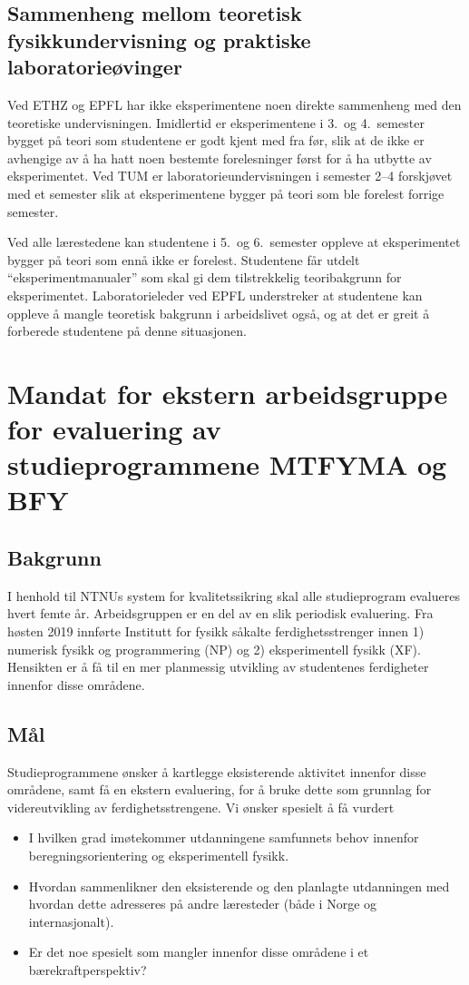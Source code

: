 \documentclass{article}
\begin{document}
\subsection{Sammenheng mellom teoretisk fysikkundervisning og praktiske laboratorieøvinger}
Ved ETHZ og EPFL har ikke eksperimentene noen direkte sammenheng med den teoretiske undervisningen. Imidlertid er eksperimentene i 3.~og 4.~semester bygget på teori som studentene er godt kjent med fra før, slik at de ikke er avhengige av å ha hatt noen bestemte forelesninger først for å ha utbytte av eksperimentet. Ved TUM er laboratorieundervisningen i semester 2--4 forskjøvet med et semester slik at eksperimentene bygger på teori som ble forelest forrige semester.

Ved alle lærestedene kan studentene i 5.~og 6.~semester oppleve at eksperimentet bygger på teori som ennå ikke er forelest. Studentene får utdelt ``eksperimentmanualer'' som skal gi dem tilstrekkelig teoribakgrunn for eksperimentet. Laboratorieleder ved EPFL understreker at studentene kan oppleve å mangle teoretisk bakgrunn i arbeidslivet også, og at det er greit å forberede studentene på denne situasjonen.

\section{Mandat for ekstern arbeidsgruppe for evaluering av studieprogrammene MTFYMA og BFY}
\subsection{Bakgrunn}
I henhold til NTNUs system for kvalitetssikring skal alle studieprogram evalueres hvert femte år. Arbeidsgruppen er en del av en slik periodisk evaluering. Fra høsten 2019 innførte Institutt for fysikk såkalte ferdighetsstrenger innen 1) numerisk fysikk og programmering (NP) og 2) eksperimentell fysikk (XF). Hensikten er å få til en mer planmessig utvikling av studentenes ferdigheter innenfor disse områdene.

\subsection{Mål}
Studieprogrammene ønsker å kartlegge eksisterende aktivitet innenfor disse områdene, samt få en ekstern evaluering, for å bruke dette som grunnlag for videreutvikling av ferdighetsstrengene.
Vi ønsker spesielt å få vurdert
\begin{itemize}
  \item I hvilken grad imøtekommer utdanningene samfunnets behov innenfor beregningsorientering og eksperimentell fysikk.
  \item Hvordan sammenlikner den eksisterende og den planlagte utdanningen med hvordan dette adresseres på andre læresteder (både i Norge og internasjonalt).
  \item Er det noe spesielt som mangler innenfor disse områdene i et bærekraftperspektiv?
\end{itemize}
\end{document}
